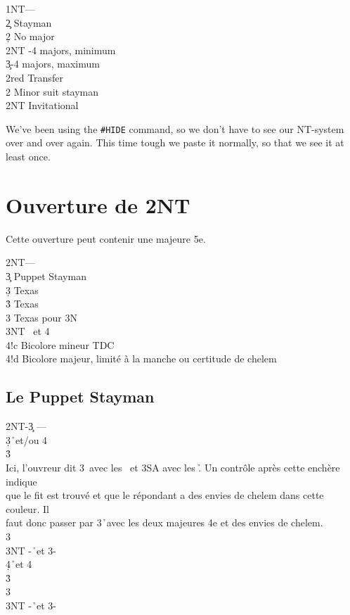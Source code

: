 \documentclass[a4paper]{article}
\begin{document}
\begin{bidtable}
1NT---\\
2\c \> Stayman\+\\
2\d \> No major\\
2NT -4 majors, minimum\\
3\c {}-4 majors, maximum\-\\
2red \> Transfer\\
2\s \> Minor suit stayman\\
2NT \> Invitational
\end{bidtable}

We've been using the \texttt{\#HIDE} command, so we don't have to see our
NT-system over and over again. This time tough we paste it
normally, so that we see it at least once.

\section{Ouverture de 2NT}

Cette ouverture peut contenir une majeure 5e.

\begin{bidtable}
2NT---\\
3\c \> Puppet Stayman\\
3\d \> Texas \h \\
3\h \> Texas \s \\
3\s \> Texas pour 3N\\
3NT \s\ et 4\h \\
4!c \> Bicolore mineur TDC\\
4!d \> Bicolore majeur, limité à la manche ou certitude de chelem
\end{bidtable}

\subsection{Le Puppet Stayman}

\begin{bidtable}
2NT-3\c \> ---\\
3\d {}\h\ et/ou 4\s \+\\
3\h {}\s \+\\
Ici, \> l'ouvreur dit 3\s\ avec les \s\ et 3SA avec les \h . Un contrôle après cette enchère indique\\
que \> le fit est trouvé et que le répondant a des envies de chelem dans cette couleur. Il\\
faut \> donc passer par 3\h\ avec les deux majeures 4e et des envies de chelem.\-\\
3\s {}\h \\
3NT -\h\ et 3-\s \\
4\d {}\h\ et 4\s \-\\
3\h {}\h \\
3\s {}\s \\
3NT -\h\ et 3-\s 
\end{bidtable}
\end{document}
